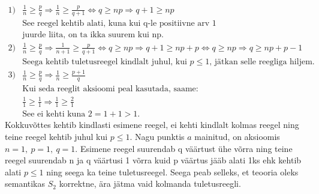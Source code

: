\documentclass{article}
\begin{document}
\begin{equation*}
\begin{aligned}
1)& \frac{1}{n}\geq\frac{p}{q}\Rightarrow\frac{1}{n}\geq\frac{p}{q+1}\Leftrightarrow q\geq np\Rightarrow q+1\geq np\\
&\text{See reegel kehtib alati, kuna kui q-le positiivne arv 1 }\\
&\text{juurde liita, on ta ikka suurem kui np.}\\
2)& \frac{1}{n}\geq\frac{p}{q}\Rightarrow\frac{1}{n+1}\geq\frac{p}{q+1}\Leftrightarrow q\geq np\Rightarrow q+1\geq np+p\Leftrightarrow q\geq np\Rightarrow q\geq np+p-1\\
&\text{Seega kehtib tuletusreegel kindlalt juhul, kui }p\leq1\text{, j\"atkan selle reegliga hiljem.}\\
3)& \frac{1}{n}\geq\frac{p}{q}\Rightarrow\frac{1}{n}\geq\frac{p+1}{q}\\
&\text{Kui seda reeglit aksioomi peal kasutada, saame:}\\
& \frac{1}{1}\geq\frac{1}{1}\Rightarrow\frac{1}{1}\geq\frac{2}{1}\\
&\text{See ei kehti kuna }2=1+1>1.
\end{aligned}
\end{equation*}
Kokkuv\~ottes kehtib kindlasti esimene reegel, ei kehti kindlalt kolmas reegel ning teine reegel kehtib juhul kui $p\leq1$. Nagu punktis $a$ mainitud, on aksioomis $n=1,\ p=1,\ q=1$. Esimene reegel suurendab q v\"a\"artust \"uhe v\~orra ning teine reegel suurendab n ja q v\"a\"artusi 1 v\~orra kuid p v\"a\"artus j\"a\"ab alati 1ks ehk kehtib alati $p\leq1$ ning seega ka teine tuletusreegel. Seega peab selleks, et teooria oleks semantikas $S_2$ korrektne, \"ara j\"atma vaid kolmanda tuletusreegli.
\end{document}
